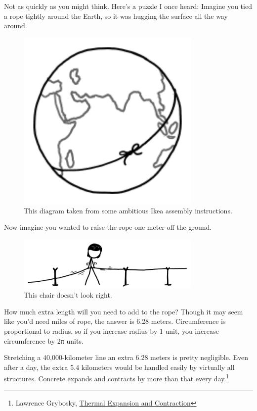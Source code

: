 {{Not as quickly as you might think. Here's a puzzle I once heard:}
Imagine you tied a rope tightly around the Earth, so it was hugging the surface all the way around.
\begin{figure}[!htbp]
\centering
\includegraphics[scale=0.5, max width=0.8\textwidth]{imgs/a/67/expanding_rope.png}
\caption{This diagram taken from some ambitious Ikea assembly instructions.}
\end{figure}
Now imagine you wanted to raise the rope one meter off the ground.
\begin{figure}[!htbp]
\centering
\includegraphics[scale=0.5, max width=0.8\textwidth]{imgs/a/67/expanding_lift.png}
\caption{This chair doesn't look right.}
\end{figure}
How much extra length will you need to add to the rope?
{Though it may seem like you'd need miles of rope, the answer is 6.28 meters. Circumference is proportional to radius, so if you increase radius by 1 unit, you increase circumference by 2π units.}

{Stretching a 40,000-kilometer line an extra 6.28 meters is pretty negligible. Even after a day, the extra 5.4 kilometers would be handled easily by virtually all structures. Concrete expands and contracts by more than that every day.{\footnote{Lawrence Grybosky, \href{http://www.engr.psu.edu/ce/courses/ce584/concrete/library/cracking/thermalexpansioncontraction/thermalexpcontr.htm}{Thermal Expansion and Contraction}} } }

}
